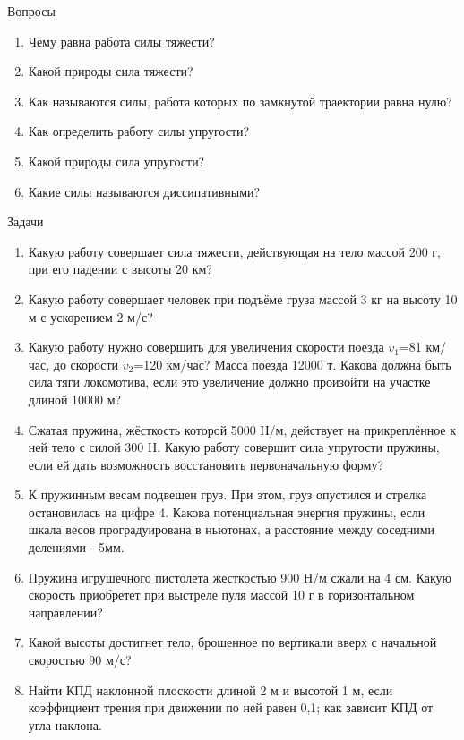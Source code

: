\documentclass[a6paper, 11pt]{diss_4}
\renewcommand{\'}{\,'}
\begin{document}
\begin{center}
   Вопросы
\end{center}
\begin{enumerate}

\item Чему равна работа силы тяжести?
\item Какой природы сила тяжести?
\item Как называются силы, работа которых по замкнутой траектории равна нулю?
\item Как определить работу силы упругости?
\item Какой природы сила упругости?
\item Какие силы называются диссипативными?

\end{enumerate}

\begin{center}
   Задачи
\end{center}
\begin{enumerate}

\item Какую работу совершает сила тяжести, действующая на  тело массой 200 г, при его падении с высоты 20 км?
\item Какую работу совершает человек при подъёме груза массой 3 кг на высоту 10 м с ускорением 2 м/с?
\item Какую работу нужно совершить для увеличения скорости поезда $v_1$=81 км/час, до скорости $v_2$=120 км/час? Масса поезда 12000 т. Какова должна быть сила тяги локомотива, если это увеличение должно произойти на участке длиной 10000 м?
\item Сжатая пружина, жёсткость которой 5000 Н/м, действует на прикреплённое к ней тело с силой 300 Н. Какую работу совершит сила упругости пружины, если ей дать возможность восстановить первоначальную форму?
\item К пружинным весам подвешен груз. При этом, груз опустился и стрелка остановилась на цифре 4. Какова потенциальная энергия пружины, если шкала весов проградуирована в ньютонах, а расстояние между соседними делениями - 5мм.
\item Пружина игрушечного пистолета жесткостью 900 Н/м сжали на 4 см. Какую скорость приобретет при выстреле пуля массой 10 г в горизонтальном направлении?
\item Какой высоты достигнет тело, брошенное по вертикали вверх с начальной скоростью 90 м/с?
\item Найти КПД наклонной плоскости длиной 2 м и высотой 1 м, если коэффициент трения при движении по ней равен 0,1; как зависит КПД от угла наклона.

\end{enumerate}
\end{document}
